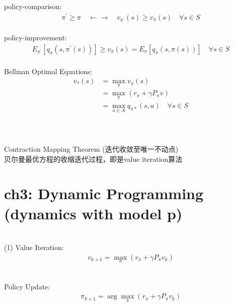 \documentclass{article}
\begin{document}
\newpage


policy-comparison: 
\begin{align*}
    \pi^{\prime} \geq \pi 
    \quad \leftarrow \rightarrow \quad 
    v_{\pi^{\prime}}(s) \geq v_{\pi}(s) 
    \quad \forall s \in S 
\end{align*}
\\[3pt]


policy-improvement: 
\begin{align*}
    E_{\pi^{\prime}} 
    \left[ q_{\pi} \left( s, \pi^{\prime}(s) \right) \right] 
    \geq v_{\pi}(s) 
    = E_{\pi} \left[ q_{\pi} \left( s, \pi(s) \right) \right] 
    \quad \forall s \in S 
\end{align*}
\\[3pt]


Bellman Optimal Equations: 
\begin{align*}
    v_{*}(s) 
    & = \max_{\pi} v_{\pi}(s) \\[3pt]
    & = \max_{\pi} \left( r_{\pi} + \gamma P_{\pi} v \right) \\[3pt]
    & = \max_{a \in A} q_{\pi *}(s, a) \quad \forall s \in S \\[3pt]
\end{align*}
\\[3pt]


~ \\[3pt]
\begin{CJK}{UTF8}{gbsn}
    Contraction Mapping Theorem (迭代收敛至唯一不动点) \\[3pt]
    贝尔曼最优方程的收缩迭代过程，即是value iteration算法 \\[3pt]
\end{CJK}


\newpage
\section*{ch3: Dynamic Programming (dynamics with model p)}


~ \\[3pt]
(1) Value Iteration: 
\begin{align*}
    v_{k+1} = \max_{\pi} \left( r_{\pi} + \gamma P_{\pi} v_{k} \right) 
\end{align*}

~ \\[3pt]
Policy Update: 
\begin{align*}
    \pi_{k+1} = \arg \max_{\pi} 
    \left( r_{\pi} + \gamma P_{\pi} v_{k} \right) 
\end{align*}
\end{document}
